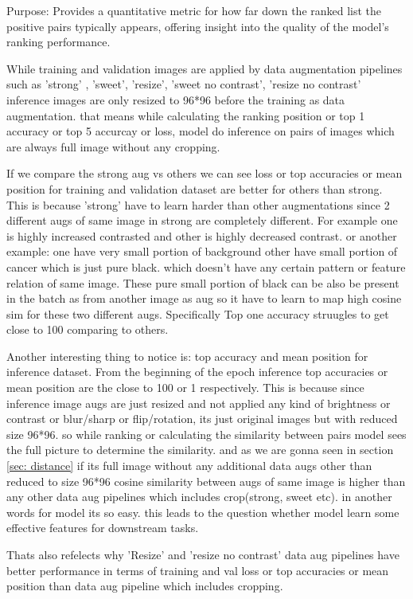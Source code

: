 Purpose: Provides a quantitative metric for how far down the ranked list the  positive pairs typically appears, offering insight into the quality of the model's ranking performance.

While training  and validation images are applied by data augmentation pipelines such as 'strong' , 'sweet', 'resize', 'sweet no contrast', 'resize no contrast' inference 
images are only resized to 96*96 before the training as data augmentation. that means while calculating the ranking position or top 1 accuracy or top 5 accurcay or loss, model do inference on pairs 
of images which are always full image without any cropping.

If we compare the strong aug vs others we can see loss or top accuracies or mean position for training and validation dataset 
are better for others than strong. This is because 'strong' have to learn harder than other augmentations since 2 different 
augs of same image in strong are completely different. For example one is highly increased contrasted and other is highly 
decreased contrast. or another example: one have very small portion of background other have small portion of cancer which is
 just pure black.  which doesn't have any certain pattern or feature relation of same image. These pure small portion of black can be also be present in the batch as  from another image as aug
 so it have to learn to map high cosine sim for these two different augs. Specifically Top one accuracy struugles to get close to 100  comparing to others.

 Another interesting thing to notice is: top accuracy and mean position for inference dataset. From the beginning of the epoch inference top accuracies or mean position are the 
 close to 100 or 1 respectively. This is because since inference image augs are just resized and not applied any kind of brightness or contrast or blur/sharp or flip/rotation,
  its just original images but with reduced size 96*96. so while ranking or calculating the similarity between pairs model sees the full picture to determine the similarity. and as we are gonna seen in section \ref{sec: distance} if its full image  without any additional data augs other than reduced to size 96*96 cosine similarity between augs
   of same image is higher than any other data aug pipelines which includes crop(strong, sweet etc).  in another words for model its so easy. this leads to the question whether model learn some effective features for downstream tasks.

Thats also refelects why 'Resize' and 'resize no contrast' data aug pipelines have better performance in terms of training and val loss or top accuracies or mean position 
than data aug pipeline which includes cropping.



